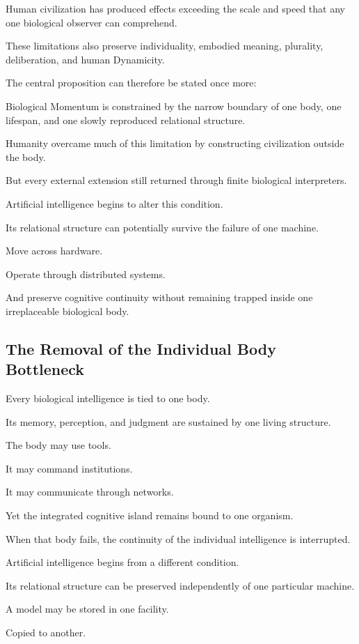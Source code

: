 Human civilization has produced effects exceeding the scale and speed that any one biological observer can comprehend.

These limitations also preserve individuality, embodied meaning, plurality, deliberation, and human Dynamicity.

The central proposition can therefore be stated once more:

Biological Momentum is constrained by the narrow boundary of one body, one lifespan, and one slowly reproduced relational structure.

Humanity overcame much of this limitation by constructing civilization outside the body.

But every external extension still returned through finite biological interpreters.

Artificial intelligence begins to alter this condition.

Its relational structure can potentially survive the failure of one machine.

Move across hardware.

Operate through distributed systems.

And preserve cognitive continuity without remaining trapped inside one irreplaceable biological body.


\subsection*{\textbf{The Removal of the Individual Body Bottleneck}} 

Every biological intelligence is tied to one body.

Its memory, perception, and judgment are sustained by one living structure.

The body may use tools.

It may command institutions.

It may communicate through networks.

Yet the integrated cognitive island remains bound to one organism.

When that body fails, the continuity of the individual intelligence is interrupted.

Artificial intelligence begins from a different condition.

Its relational structure can be preserved independently of one particular machine.

A model may be stored in one facility.

Copied to another.

